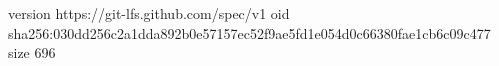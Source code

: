 version https://git-lfs.github.com/spec/v1
oid sha256:030dd256c2a1dda892b0e57157ec52f9ae5fd1e054d0c66380fae1cb6c09c477
size 696
